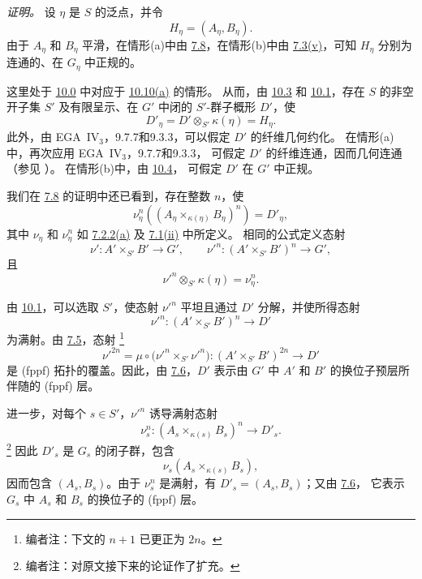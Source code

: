 \emph{证明。}
设 \(\eta\) 是 \(S\) 的泛点，并令
\[
  H_\eta=(A_\eta,B_\eta).
\]
由于 \(A_\eta\) 和 \(B_\eta\) 平滑，在情形\textup{(a)}中由
\hyperref[prop:sga3-VIB-7.8]{7.8}，在情形\textup{(b)}中由
\hyperref[concl:sga3-VIB-7.3-v]{7.3\textup{(v)}}，可知
\(H_\eta\) 分别为连通的、在 \(G_\eta\) 中正规的。

这里处于 \hyperref[par:sga3-VIB-10.0]{10.0} 中对应于
\hyperref[par:sga3-VIB-10.10-a]{10.10\textup{(a)}} 的情形。
从而，由 \hyperref[lem:sga3-VIB-10.3]{10.3} 和
\hyperref[par:sga3-VIB-10.1]{10.1}，存在 \(S\) 的非空开子集
\(S'\) 及有限呈示、在 \(G'\) 中闭的 \(S'\)-群子概形 \(D'\)，使
\[
  D'_\eta=D'\otimes_{S'}\kappa(\eta)=H_\eta.
\]
此外，由 EGA~IV\(_3\)，9.7.7和9.3.3，可以假定 \(D'\) 的纤维几何约化。
在情形\textup{(a)}中，再次应用 EGA~IV\(_3\)，9.7.7和9.3.3，
可假定 \(D'\) 的纤维连通，因而几何连通
\textup{（参见 \hyperref[prop:sga3-VIA-2.1.1]%
{}）}。
在情形\textup{(b)}中，由 \hyperref[lem:sga3-VIB-10.4]{10.4}，
可假定 \(D'\) 在 \(G'\) 中正规。

我们在 \hyperref[prop:sga3-VIB-7.8]{7.8} 的证明中还已看到，存在整数
\(n\)，使
\label{form:sga3-VIB-10.12-generic-image}%
\[
  \nu_\eta^n
  \left((A_\eta\times_{\kappa(\eta)}B_\eta)^n\right)
  =D'_\eta,
\]
其中 \(\nu_\eta\) 和 \(\nu_\eta^n\) 如
\hyperref[def:sga3-VIB-7.2.2-a]{7.2.2\textup{(a)}} 及
\hyperref[concl:sga3-VIB-7.1-ii]{7.1\textup{(ii)}} 中所定义。
相同的公式定义态射
\label{form:sga3-VIB-10.12-nu-prime}%
\[
  \nu':A'\times_{S'}B'\longrightarrow G',
  \qquad
  {\nu'}^n:(A'\times_{S'}B')^n\longrightarrow G',
\]
且
\[
  {\nu'}^n\otimes_{S'}\kappa(\eta)=\nu_\eta^n.
\]

由 \hyperref[par:sga3-VIB-10.1]{10.1}，可以选取 \(S'\)，使态射
\({\nu'}^n\) 平坦且通过 \(D'\) 分解，并使所得态射
\[
  {\nu'}^n:(A'\times_{S'}B')^n\longrightarrow D'
\]
为满射。由 \hyperref[lem:sga3-VIB-7.5]{7.5}，态射%
\footnote{\label{note:sga3-VIB-98}编者注：下文的 \(n+1\) 已更正为 \(2n\)。}
\label{form:sga3-VIB-10.12-covering-map}%
\[
  {\nu'}^{2n}
  =\mu\circ\bigl({\nu'}^n\times_{S'}{\nu'}^n\bigr):
  (A'\times_{S'}B')^{2n}\longrightarrow D'
\]
是 \textup{(fppf)} 拓扑的覆盖。因此，由
\hyperref[prop:sga3-VIB-7.6]{7.6}，\(D'\) 表示由 \(G'\) 中
\(A'\) 和 \(B'\) 的换位子预层所伴随的 \textup{(fppf)} 层。

进一步，对每个 \(s\in S'\)，\({\nu'}^n\) 诱导满射态射
\[
  \nu_s^n:
  (A_s\times_{\kappa(s)}B_s)^n\longrightarrow D'_s.
\]%
\footnote{\label{note:sga3-VIB-99}编者注：对原文接下来的论证作了扩充。}
因此 \(D'_s\) 是 \(G_s\) 的闭子群，包含
\[
  \nu_s(A_s\times_{\kappa(s)}B_s),
\]
因而包含 \((A_s,B_s)\)。由于 \(\nu_s^n\) 是满射，有
\(D'_s=(A_s,B_s)\)；又由 \hyperref[prop:sga3-VIB-7.6]{7.6}，
它表示 \(G_s\) 中 \(A_s\) 和 \(B_s\) 的换位子的 \textup{(fppf)} 层。

